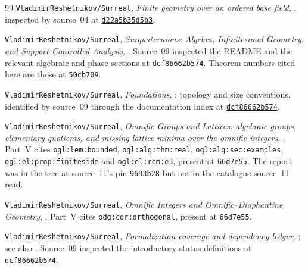 \documentclass[11pt,letterpaper]{article}
\numberwithin{equation}{section}
\theoremstyle{definition}
\theoremstyle{remark}
\newcommand{\repo}{\texttt{VladimirReshetnikov/Surreal}}
\begin{document}
\begin{thebibliography}{99}
\repo,
\emph{Finite geometry over an ordered base field},
, inspected by source~04 at
\href{https://github.com/VladimirReshetnikov/Surreal/blob/d22a5b35d5b3040e870c3cfd6d1c8f7259e094b0/Surreal/Algebra/Geometry.lean}{\texttt{d22a5b35d5b3}}.

\repo,
\emph{Surquaternions: Algebra, Infinitesimal Geometry, and Support-Controlled Analysis},
.
Source~09 inspected the README and the relevant algebraic and phase sections at
\href{https://github.com/VladimirReshetnikov/Surreal/blob/dcf86662b574988e75d08d515d3a2a5ba7bbc0d7/docs/surquaternions/surquaternions/article.tex}{\texttt{dcf86662b574}}.
Theorem numbers cited here are those at \texttt{50cb709}.

\repo,
\emph{Foundations},
; topology and size
conventions, identified by source~09 through the documentation index at
\href{https://github.com/VladimirReshetnikov/Surreal/tree/dcf86662b574988e75d08d515d3a2a5ba7bbc0d7/docs/foundations-and-computation/foundations}{\texttt{dcf86662b574}}.

\repo,
\emph{Omnific Groups and Lattices: algebraic groups, elementary quotients, and
missing lattice minima over the omnific integers},
.
Part~V cites \texttt{ogl:lem:bounded}, \texttt{ogl:alg:thm:real},
\texttt{ogl:alg:sec:examples}, \texttt{ogl:el:prop:finiteside} and
\texttt{ogl:el:rem:e3}, present at \texttt{66d7e55}. The report was in the tree
at source~11's pin \texttt{9693b28} but not in the catalogue source~11 read.

\repo,
\emph{Omnific Integers and Omnific--Diophantine Geometry},
.
Part~V cites \texttt{odg:cor:orthogonal}, present at \texttt{66d7e55}.

\repo,
\emph{Formalization coverage and dependency ledger},
; see also .
Source~09 inspected the introductory status definitions at
\href{https://github.com/VladimirReshetnikov/Surreal/blob/dcf86662b574988e75d08d515d3a2a5ba7bbc0d7/docs/FORMALIZATION.md}{\texttt{dcf86662b574}}.

\end{thebibliography}
\end{document}
